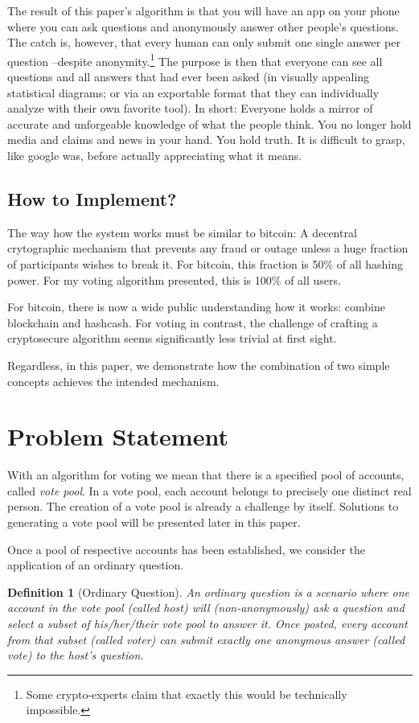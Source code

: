 \documentclass{article}
\newtheorem{defn}[thm]{Definition}
\theoremstyle{definition}
\begin{document}
	The result of this paper's algorithm is that you will have an app on your phone where you can ask questions and anonymously answer other people's questions. The catch is, however, that every human can only submit one single answer per question --despite anonymity.\footnote{Some crypto-experts claim that exactly this would be technically impossible.} The purpose is then that everyone can see all questions and all answers that had ever been asked (in visually appealing statistical diagrams; or via an exportable format that they can individually analyze with their own favorite tool). In short: Everyone holds a mirror of accurate and unforgeable knowledge of what the people think. You no longer hold media and claims and news in your hand. You hold truth. It is difficult to grasp, like google was, before actually appreciating what it means.
	
	\subsection{How to Implement?}
	The way how the system works must be similar to bitcoin: A decentral crytographic mechanism that prevents any fraud or outage unless a huge fraction of participants wishes to break it. For bitcoin, this fraction is 50\% of all hashing power. For my voting algorithm presented, this is 100\% of all users.
	
	For bitcoin, there is now a wide public understanding how it works: combine blockchain and hashcash. For voting in contrast, the challenge of crafting a cryptosecure algorithm seems significantly less trivial at first sight. 
	
	Regardless, in this paper, we demonstrate how the combination of two simple concepts achieves the intended mechanism.
	
	\section{Problem Statement}
	With an algorithm for voting we mean that there is a specified pool of accounts, called \emph{vote pool}. In a vote pool, each account belongs to precisely one distinct real person. The creation of a vote pool is already a challenge by itself. Solutions to generating a vote pool will be presented later in this paper.
	
	Once a pool of respective accounts has been established, we consider the application of an ordinary question.
	
	\begin{defn}[Ordinary Question]
		An ordinary question is a scenario where one account in the vote pool (called host) will (non-anonymously) ask a question and select a subset of his/her/their vote pool to answer it. Once posted, every account from that subset (called voter) can submit exactly one anonymous answer (called vote) to the host's question.
	\end{defn}
	
\end{document}
